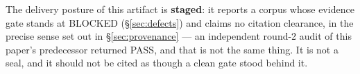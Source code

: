 \documentclass[11pt,a4paper]{article}
\theoremstyle{plain}
\theoremstyle{definition}
\theoremstyle{remark}
\begin{document}
The delivery posture of this artifact is \textbf{staged}: it reports a corpus whose evidence
gate stands at BLOCKED (\S\ref{sec:defects}) and claims no citation clearance, in the precise
sense set out in \S\ref{sec:provenance} --- an independent round-2 audit of this paper's
predecessor returned PASS, and that is not the same thing. It is not a seal, and it should not
be cited as though a clean gate stood behind it.

\printbibliography[heading=bibintoc,title={References}]
\end{document}
